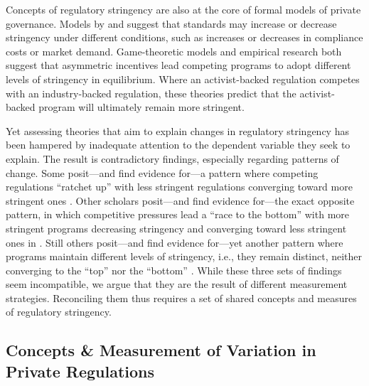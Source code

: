 \documentclass[
      12pt,
            Review ]{article}
\begin{document}
Concepts of regulatory stringency are also at the core of formal models
of private governance. Models by \citet{Abderrazak2009} and
\citet{Fischer2014} suggest that standards may increase or decrease
stringency under different conditions, such as increases or decreases in
compliance costs or market demand. Game-theoretic models
\citep{Fischer2014, Li2015, Poret2016} and empirical research
\citep{Cashore2004} both suggest that asymmetric incentives lead
competing programs to adopt different levels of stringency in
equilibrium. Where an activist-backed regulation competes with an
industry-backed regulation, these theories predict that the
activist-backed program will ultimately remain more stringent.

Yet assessing theories that aim to explain changes in regulatory
stringency has been hampered by inadequate attention to the dependent
variable they seek to explain. The result is contradictory findings,
especially regarding patterns of change. Some posit---and find evidence
for---a pattern where competing regulations ``ratchet up'' with less
stringent regulations converging toward more stringent ones
\citep{Overdevest2005, Overdevest2010, Overdevest2014}. Other scholars
posit---and find evidence for---the exact opposite pattern, in which
competitive pressures lead a ``race to the bottom'' with more stringent
programs decreasing stringency and converging toward less stringent ones
in \citep{Abbott2010, Fransen2011, Gulbrandsen2004}. Still others
posit---and find evidence for---yet another pattern where programs
maintain different levels of stringency, i.e., they remain distinct,
neither converging to the ``top'' nor the ``bottom''
\citep{Fischer2014, Li2015, Poret2016, Cashore2004}. While these three
sets of findings seem incompatible, we argue that they are the result of
different measurement strategies. Reconciling them thus requires a set
of shared concepts and measures of regulatory stringency.

\subsection{Concepts \& Measurement of Variation in Private
Regulations}\label{concepts-measurement-of-variation-in-private-regulations}
\end{document}

